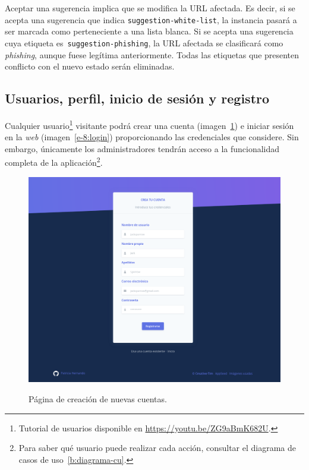 Aceptar una sugerencia implica que se modifica la URL afectada. Es decir, si se acepta una sugerencia que indica \texttt{suggestion-white-list}, la instancia pasará a ser marcada como perteneciente a una lista blanca. Si se acepta una sugerencia cuya etiqueta es~\texttt{suggestion-phishing}, la URL afectada se clasificará como \textit{phishing}, aunque fuese legítima anteriormente. Todas las etiquetas que presenten conflicto con el nuevo estado serán eliminadas.

\subsection{Usuarios, perfil, inicio de sesión y registro}

Cualquier usuario\footnote{Tutorial de usuarios disponible en \url{https://youtu.be/ZG9aBmK682U}.} visitante podrá crear una cuenta (imagen~\ref{e-8:register}) e iniciar sesión en la \textit{web} (imagen~\ref{e-8:login}) proporcionando las credenciales que considere. Sin embargo, únicamente los administradores tendrán acceso a la funcionalidad completa de la aplicación\footnote{Para saber qué usuario puede realizar cada acción, consultar el diagrama de casos de uso~\ref{b:diagrama-cu}.}.

\begin{figure}[h]
	\caption[Manual de usuario: crear nueva cuenta]{Página de creación de nuevas cuentas.}
	\centering
	\includegraphics[scale=0.25]{../img/anexos/user_guide/8_register}
	\label{e-8:register}
\end{figure}

